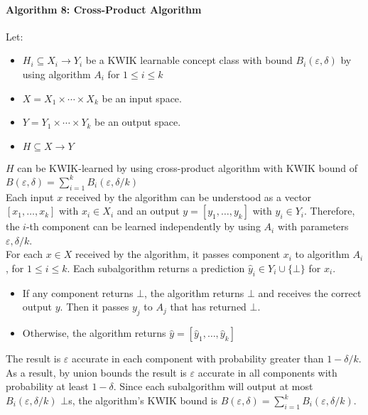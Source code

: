 \paragraph{Algorithm 8: Cross-Product Algorithm}
Let:
\begin{itemize}
  \item $H_i \subseteq X_i \to Y_i$ be a KWIK learnable concept class with bound $B_i(\varepsilon, \delta)$ by using algorithm $A_i$ for $1 \leq i \leq k$
  \item $X = X_1 \times \cdots \times X_k$ be an input space.
  \item $Y = Y_1 \times \cdots \times Y_k$ be an output space.
  \item $H \subseteq X \to Y$
\end{itemize}

$H$ can be KWIK-learned by using cross-product algorithm with KWIK bound of $B(\varepsilon,\delta) =  \sum^{k}_{i=1}B_i(\varepsilon,\delta/k)$ \\

Each input $x$ received by the algorithm can be understood as a vector $[x_1,\ldots,x_k]$ with $x_i \in X_i$ and an output $y = [y_1, \ldots, y_k]$ with $y_i \in Y_i$. Therefore, the $i$-th component can be learned independently by using $A_i$
with parameters $\varepsilon, \delta/k$. \\

For each $x \in X$ received by the algorithm, it passes component $x_i$ to algorithm $A_i$, for $1 \leq i \leq k$. Each subalgorithm returns a prediction $\hat{y}_i \in Y_i \cup \{\bot\}$ for $x_i$.
\begin{itemize}
  \item  If any component returns $\bot$, the algorithm returns $\bot$ and receives the correct output $y$.
    Then it passes $y_j$ to $A_j$ that has returned $\bot$.
  \item Otherwise, the algorithm returns $\hat{y} = [\hat{y}_1, \ldots, \hat{y}_k]$
\end{itemize}

The result is $\varepsilon$ accurate in each component with probability greater than $1-\delta/k$. As a result, by union bounds the result is $\varepsilon$ accurate in all components with probability at least $1-\delta$.
Since each subalgorithm will output at most $B_i(\varepsilon,\delta/k)$ $\bot$s, the algorithm's KWIK bound is $B(\varepsilon, \delta) = \sum^{k}_{i=1} B_i(\varepsilon,\delta/k)$.


